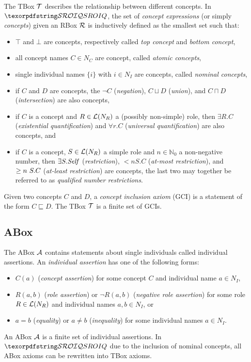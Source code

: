 The TBox $\mathcal{T}$ describes the relationship between different concepts. In $\SROIQ$, the set of \emph{concept expressions} (or simply \emph{concepts}) given an RBox $\mathcal{R}$ is inductively defined as the smallest set such that:
\begin{itemize}
  \item $\top$ and $\bot$ are concepts, respectively called \emph{top concept} and \emph{bottom concept},
  \item all concept names $C \in N_C$ are concept, called \emph{atomic concepts},
  \item single individual names $\{ i \}$ with $i \in N_I$ are concepts, called \emph{nominal concepts},
  \item if $C$ and $D$ are concepts, the $\lnot C$ (\emph{negation}), $C \sqcup D$ (\emph{union}), and $C \sqcap D$ (\emph{intersection}) are also concepts,
  \item if $C$ is a concept and $R \in \mathcal{L}(N_R)$ a (possibly non-simple) role, then $\exists R.C$ (\emph{existential quantification}) and $\forall r.C$ (\emph{universal quantification}) are also concepts, and
  \item if $C$ is a concept, $S \in \mathcal{L}(N_R)$ a simple role and $n \in \mathbb{N}_0$ a non-negative number, then $\exists S.\mathit{Self}$ (\emph{\self restriction}), $\less n S.C$ (\emph{at-most restriction}), and $\geq n~S.C$ (\emph{at-least restriction}) are concepts, the last two may together be referred to as \emph{qualified number restrictions}.
\end{itemize}
Given two concepts $C$ and $D$, a \emph{concept inclusion axiom} (GCI) is a statement of the form $C \sqsubseteq D$. The TBox $\mathcal{T}$ is a finite set of GCIs.

\subsection{ABox} \label{abox}

The ABox $\mathcal{A}$ contains statements about single individuals called individual assertions. An \emph{individual assertion} has one of the following forms:
\begin{itemize}
  \item $C(a)$ (\emph{concept assertion}) for some concept $C$ and individual name $a \in N_I$,
  \item $R(a, b)$ (\emph{role assertion}) or $\lnot R(a, b)$ (\emph{negative role assertion}) for some role $R \in \mathcal{L}(N_R)$ and individual names $a, b \in N_I$, or
  \item $a = b$ (\emph{equality}) or $a \not = b$ (\emph{inequality}) for some individual names $a \in N_I$.
\end{itemize}
An ABox $\mathcal{A}$ is a finite set of individual assertions. In $\SROIQ$ due to the inclusion of nominal concepts, all ABox axioms can be rewritten into TBox axioms.
